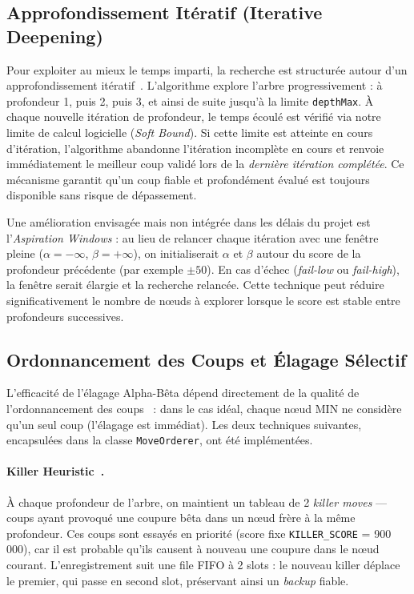\documentclass[12pt,a4paper]{article}
\begin{document}
\subsection{Approfondissement Itératif (Iterative Deepening)}
Pour exploiter au mieux le temps imparti, la recherche est structurée autour d'un approfondissement itératif~\cite{cp_iterative_deepening}. L'algorithme explore l'arbre progressivement : à profondeur 1, puis 2, puis 3, et ainsi de suite jusqu'à la limite \texttt{depthMax}. 
À chaque nouvelle itération de profondeur, le temps écoulé est vérifié via notre limite de calcul logicielle (\textit{Soft Bound}). Si cette limite est atteinte en cours d'itération, l'algorithme abandonne l'itération incomplète en cours et renvoie immédiatement le meilleur coup validé lors de la \textit{dernière itération complétée}. Ce mécanisme garantit qu'un coup fiable et profondément évalué est toujours disponible sans risque de dépassement.

Une amélioration envisagée mais non intégrée dans les délais du projet est l'\textit{Aspiration Windows} : au lieu de relancer chaque itération avec une fenêtre pleine ($\alpha = -\infty$, $\beta = +\infty$), on initialiserait $\alpha$ et $\beta$ autour du score de la profondeur précédente (par exemple $\pm 50$). En cas d'échec (\textit{fail-low} ou \textit{fail-high}), la fenêtre serait élargie et la recherche relancée. Cette technique peut réduire significativement le nombre de nœuds à explorer lorsque le score est stable entre profondeurs successives.

\subsection{Ordonnancement des Coups et Élagage Sélectif}
\label{sec:move_ordering}

L'efficacité de l'élagage Alpha-Bêta dépend directement de la qualité de l'ordonnancement des coups~\cite{cp_move_ordering} : dans le cas idéal, chaque nœud MIN ne considère qu'un seul coup (l'élagage est immédiat). Les deux techniques suivantes, encapsulées dans la classe \texttt{MoveOrderer}, ont été implémentées.

\paragraph{Killer Heuristic~\cite{cp_killer}.}
À chaque profondeur de l'arbre, on maintient un tableau de 2 \textit{killer moves} — coups ayant provoqué une coupure bêta dans un nœud frère à la même profondeur. Ces coups sont essayés en priorité (score fixe \texttt{KILLER\_SCORE} = 900\,000), car il est probable qu'ils causent à nouveau une coupure dans le nœud courant. L'enregistrement suit une file FIFO à 2 slots : le nouveau killer déplace le premier, qui passe en second slot, préservant ainsi un \textit{backup} fiable.
\end{document}

